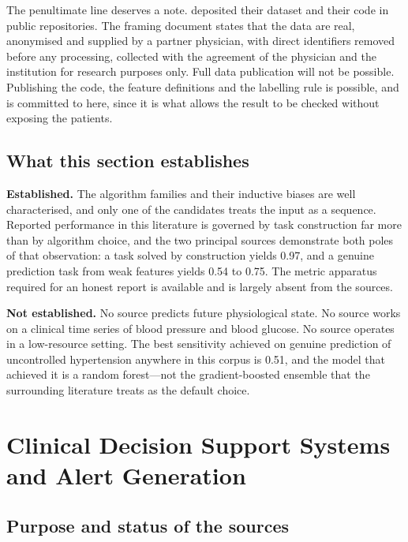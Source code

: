 \documentclass[12pt,a4paper,oneside]{report}
\begin{document}
The penultimate line deserves a note. \Textcite{mendoza2025} deposited their dataset and their code in public repositories. The framing document states that the data are real, anonymised and supplied by a partner physician, with direct identifiers removed before any processing, collected with the agreement of the physician and the institution for research purposes only. Full data publication will not be possible. Publishing the code, the feature definitions and the labelling rule is possible, and is committed to here, since it is what allows the result to be checked without exposing the patients.

\subsection{What this section establishes}\label{sec:ml-conclusion}

\textbf{Established.} The algorithm families and their inductive biases are well characterised, and only one of the candidates treats the input as a sequence. Reported performance in this literature is governed by task construction far more than by algorithm choice, and the two principal sources demonstrate both poles of that observation: a task solved by construction yields 0.97, and a genuine prediction task from weak features yields 0.54 to 0.75. The metric apparatus required for an honest report is available and is largely absent from the sources.

\textbf{Not established.} No source predicts future physiological state. No source works on a clinical time series of blood pressure and blood glucose. No source operates in a low-resource setting. The best sensitivity achieved on genuine prediction of uncontrolled hypertension anywhere in this corpus is 0.51, and the model that achieved it is a random forest---not the gradient-boosted ensemble that the surrounding literature treats as the default choice.

\section{Clinical Decision Support Systems and Alert Generation}\label{sec:cdss}

\subsection*{Purpose and status of the sources}
\end{document}

